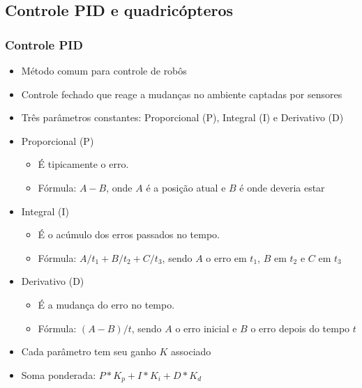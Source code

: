 \documentclass{beamer}
\begin{document}
\subsection*{Controle PID e quadricópteros}
\begin{frame}[allowframebreaks]
	
	\frametitle{Controle PID}
	\begin{itemize}
	
		\item Método comum para controle de robôs
		
		\item Controle fechado que reage a mudanças no ambiente captadas por sensores
		
		\item Três parâmetros constantes: Proporcional (P), Integral (I) e Derivativo (D)
		
	\framebreak
	
		\item Proporcional (P)
			\begin{itemize}
				\item É tipicamente o erro. 
				\item Fórmula: $A - B$, onde $A$ é a posição atual e $B$ é onde deveria estar 	
			\end{itemize}
			
		\item Integral (I)
		\begin{itemize}
			\item É o acúmulo dos erros passados no tempo. 
			\item Fórmula: $A/t_1 + B/t_2 + C/t_3$, sendo $A$ o erro em $t_1$, $B$ em $t_2$ e $C$ em $t_3$ 	
		\end{itemize}	
		
		\item Derivativo (D)
		\begin{itemize}
			\item É a mudança do erro no tempo. 
			\item Fórmula: $(A-B)/t$, sendo $A$ o erro inicial e $B$ o erro depois do tempo $t$ 	
		\end{itemize}	
		
	\framebreak
	
		\item Cada parâmetro tem seu ganho $K$ associado
		
		\item Soma ponderada: $P*K_p + I*K_i + D*K_d$
		

\end{itemize}
\end{frame}
\end{document}
